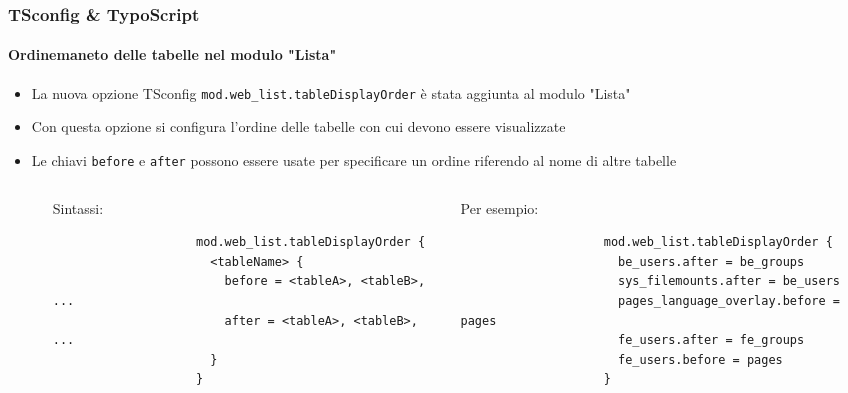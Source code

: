 \begin{frame}[fragile]
	\frametitle{TSconfig \& TypoScript}
	\framesubtitle{Ordinemaneto delle tabelle nel modulo "Lista"}

	\lstset{basicstyle=\tiny\ttfamily}

	\begin{itemize}

		\item La nuova opzione TSconfig \texttt{mod.web\_list.tableDisplayOrder} è stata aggiunta al modulo "Lista"

		\item Con questa opzione si configura l'ordine delle tabelle con cui devono essere visualizzate

		\item Le chiavi \texttt{before} e \texttt{after} possono essere usate per specificare un ordine riferendo al nome di altre tabelle

		\begin{columns}[T]
			\begin{column}{.07\textwidth}
			\end{column}
			\begin{column}{.465\textwidth}

				\small Sintassi:\normalsize

				\begin{lstlisting}
					mod.web_list.tableDisplayOrder {
					  <tableName> {
					    before = <tableA>, <tableB>, ...
					    after = <tableA>, <tableB>, ...
					  }
					}
				\end{lstlisting}
			\end{column}
			\begin{column}{.465\textwidth}

				\small Per esempio:\normalsize

				\begin{lstlisting}
					mod.web_list.tableDisplayOrder {
					  be_users.after = be_groups
					  sys_filemounts.after = be_users
					  pages_language_overlay.before = pages
					  fe_users.after = fe_groups
					  fe_users.before = pages
					}
				\end{lstlisting}

			\end{column}
		\end{columns}

	\end{itemize}

\end{frame}

